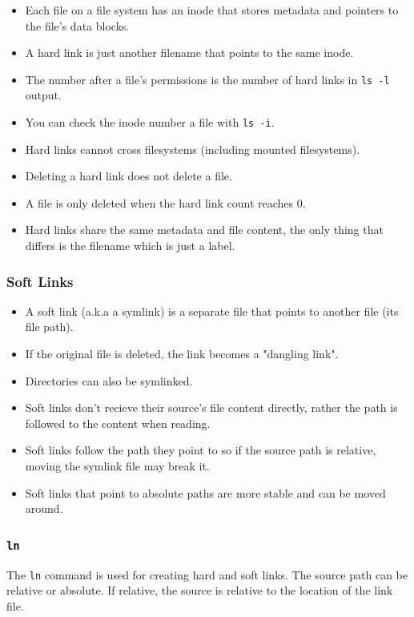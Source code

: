 \documentclass{article}
\newcommand{\code}[1]{\texttt{#1}}
\begin{document}
\begin{itemize}
    \item Each file on a file system has an inode that stores metadata and pointers to the file's data blocks.
    \item A hard link is just another filename that points to the same inode.
    \item The number after a file's permissions is the number of hard links in \code{ls -l} output.
    \item You can check the inode number a file with \code{ls -i}.
    \item Hard links cannot cross filesystems (including mounted filesystems).
    \item Deleting a hard link does not delete a file.
    \item A file is only deleted when the hard link count reaches 0.
    \item Hard links share the same metadata and file content, the only thing that differs is the filename which is just a label.
\end{itemize}

\subsubsection{Soft Links}

\begin{itemize}
    \item A soft link (a.k.a a symlink) is a separate file that points to another file (its file path).
    \item If the original file is deleted, the link becomes a "dangling link".
    \item Directories can also be symlinked.
    \item Soft links don't recieve their source's file content directly, rather the path is followed to the content when reading.
    \item Soft links follow the path they point to so if the source path is relative, moving the symlink file may break it.
    \item Soft links that point to absolute paths are more stable and can be moved around.
\end{itemize}

\subsubsection{\code{ln}}

The \code{ln} command is used for creating hard and soft links. The source path can be relative or absolute. If relative, the source is relative to the location of the link file.
\end{document}

